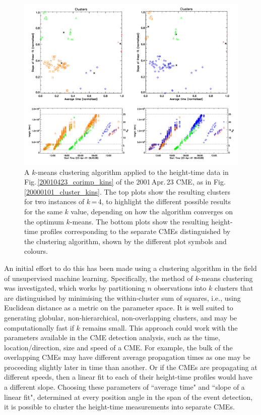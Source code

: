 \documentclass[referee,a4paper,12pt,traditabstract]{swsc}
\begin{document}
\begin{linenumbers}
\begin{figure}[ht]
\centerline{\includegraphics[width=\linewidth]{images/20010423_cluster_kins.pdf}}
\caption{A $k$-means clustering algorithm applied to the height-time data in Fig.\,\ref{20010423_corimp_kins} of the 2001\,Apr.\,23 CME, as in Fig.\,\ref{20000101_cluster_kins}. The top plots show the resulting clusters for two instances of $k$\,=\,4, to highlight the different possible results for the same $k$ value, depending on how the algorithm converges on the optimum $k$-means. The bottom plots show the resulting height-time profiles corresponding to the separate CMEs distinguished by the clustering algorithm, shown by the different plot symbols and colours.}
\label{20010423_cluster_kins}
\end{figure}


An initial effort to do this has been made using a clustering algorithm in the field of unsupervised machine learning. Specifically, the method of $k$-means clustering was investigated, which works by partitioning $n$ observations into $k$ clusters that are distinguished by minimising the within-cluster sum of squares, i.e., using Euclidean distance as a metric on the parameter space. It is well suited to generating globular, non-hierarchical, non-overlapping clusters, and may be computationally fast if $k$ remains small. This approach could work with the parameters available in the CME detection analysis, such as the time, location/direction, size and speed of a CME. For example, the bulk of the overlapping CMEs may have different average propagation times as one may be proceeding slightly later in time than another. Or if the CMEs are propagating at different speeds, then a linear fit to each of their height-time profiles would have a different slope. Choosing these parameters of ``average time" and ``slope of a linear fit", determined at every position angle in the span of the event detection, it is possible to cluster the height-time measurements into separate CMEs.


\end{linenumbers}
\end{document}
